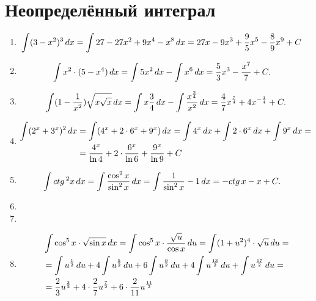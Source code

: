 
\section{Неопределённый интеграл}
\begin{enumerate}
  \item %
    \begin{align*}
      \int(3-x^2)^3\,dx &= \int27 - 27x^2  + 9x^4 - x^8\,dx =
      27x - 9x^3 + \frac{9}{5}x^5 - \frac{8}{9}x^9 + C
    \end{align*}
  \item %
    \begin{align*}
      \int x^2\cdot (5-x^4)\,dx &= \int5x^2\,dx - \int x^6\,dx =
      \frac{5}{3}x^3 - \frac{x^7}{7} + C
    .\end{align*}
  \item %
    \begin{align*}
      \int(1-\frac{1}{x^2})\sqrt{x\sqrt{x}}\,dx 
      =\int x{\frac{3}{4}}\,dx - \int\frac{x^{\frac{3}{4}}}{x^2}\,dx
      =\frac{4}{7}x^{\frac{7}{4}} + 4x^{-\frac{1}{4}} + C
    .\end{align*}
  \item %
    \begin{align*}
      \int(2^x + 3^x)^2\,dx 
      &= \int(4^x + 2 \cdot 6^x + 9^x)\,dx = \int4^x\,dx + \int2 \cdot 6^x\,dx + \int9^x\,dx = \\
      &= \dfrac{4^x}{\ln{4}} + 2 \cdot \dfrac{6^x}{\ln{6}} + \dfrac{9^x}{\ln{9}} + C
    \end{align*}
  \item %
  \begin{align*}
    \int ctg\,^2x\,dx = \int\frac{\cos^2{x}}{\sin^2x}\,dx
    &= \int\frac{1}{\sin^2x} - 1\,dx = -ctg\,x - x + C
  .\end{align*}
  \item %
  \item %
  \item %
\begin{paracol}{2}
  \begin{align*}
    &\xint{\cos^{5}x\cdot\sqrt{\sin{x}}} = \int \cos^5{x} \cdot \dfrac{\sqrt{u}}{\cos{x}}\du =
    \int (1+u^2)^4 \cdot \sqrt{u}\du = \\
    &= \uPowFr{1}{2} + 4\uPowFr{5}{2} + 6\uPowFr{9}{2} + 4\uPowFr{13}{2} + \uPowFr{17}{2} = \\
    &= \multAndPowFrU{2}{3} + 4\cdot \multAndPowFrU{2}{7} + 6\cdot \multAndPowFrU{2}{11}

\end{align*}
\end{paracol}
\end{enumerate}
